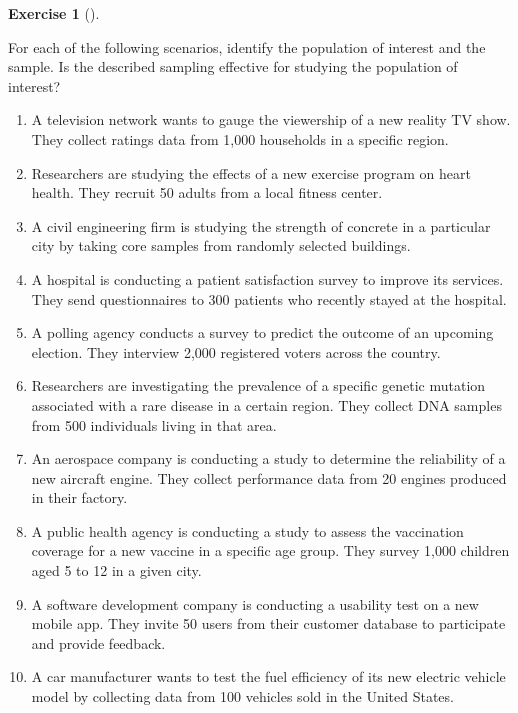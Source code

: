 \documentclass[
  letterpaper,
  DIV=11,
  numbers=noendperiod]{scrreprt}
\providecommand{\tightlist}{%
  \setlength{\itemsep}{0pt}\setlength{\parskip}{0pt}}\usepackage{longtable,booktabs,array}
\theoremstyle{definition}
\newtheorem{exercise}{Exercise}[chapter]
\theoremstyle{definition}
\theoremstyle{definition}
\theoremstyle{remark}
\begin{document}
\begin{exercise}[]\protect\hypertarget{exr-10.1}{}\label{exr-10.1}

For each of the following scenarios, identify the population of interest
and the sample. Is the described sampling effective for studying the
population of interest?

\begin{enumerate}
\def\labelenumi{\alph{enumi}.}
\tightlist
\item
  A television network wants to gauge the viewership of a new reality TV
  show. They collect ratings data from 1,000 households in a specific
  region.
\item
  Researchers are studying the effects of a new exercise program on
  heart health. They recruit 50 adults from a local fitness center.
\item
  A civil engineering firm is studying the strength of concrete in a
  particular city by taking core samples from randomly selected
  buildings.
\item
  A hospital is conducting a patient satisfaction survey to improve its
  services. They send questionnaires to 300 patients who recently stayed
  at the hospital.
\item
  A polling agency conducts a survey to predict the outcome of an
  upcoming election. They interview 2,000 registered voters across the
  country.
\item
  Researchers are investigating the prevalence of a specific genetic
  mutation associated with a rare disease in a certain region. They
  collect DNA samples from 500 individuals living in that area.
\item
  An aerospace company is conducting a study to determine the
  reliability of a new aircraft engine. They collect performance data
  from 20 engines produced in their factory.
\item
  A public health agency is conducting a study to assess the vaccination
  coverage for a new vaccine in a specific age group. They survey 1,000
  children aged 5 to 12 in a given city.
\item
  A software development company is conducting a usability test on a new
  mobile app. They invite 50 users from their customer database to
  participate and provide feedback.
\item
  A car manufacturer wants to test the fuel efficiency of its new
  electric vehicle model by collecting data from 100 vehicles sold in
  the United States.
\end{enumerate}

\end{exercise}
\end{document}
